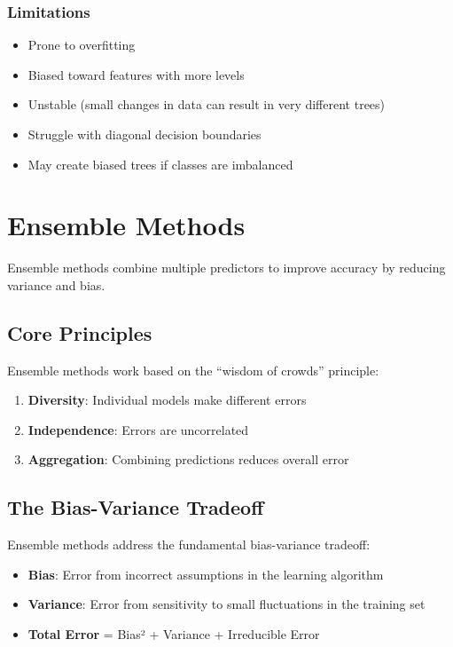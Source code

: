 \documentclass[
  letterpaper,
  DIV=11,
  numbers=noendperiod]{scrreprt}
\providecommand{\tightlist}{%
  \setlength{\itemsep}{0pt}\setlength{\parskip}{0pt}}\usepackage{longtable,booktabs,array}
\begin{document}
\subsubsection{Limitations}\label{limitations-1}

\begin{itemize}
\tightlist
\item
  Prone to overfitting
\item
  Biased toward features with more levels
\item
  Unstable (small changes in data can result in very different trees)
\item
  Struggle with diagonal decision boundaries
\item
  May create biased trees if classes are imbalanced
\end{itemize}

\section{Ensemble Methods}\label{ensemble-methods}

Ensemble methods combine multiple predictors to improve accuracy by
reducing variance and bias.

\subsection{Core Principles}\label{core-principles}

Ensemble methods work based on the ``wisdom of crowds'' principle:

\begin{enumerate}
\def\labelenumi{\arabic{enumi}.}
\tightlist
\item
  \textbf{Diversity}: Individual models make different errors
\item
  \textbf{Independence}: Errors are uncorrelated
\item
  \textbf{Aggregation}: Combining predictions reduces overall error
\end{enumerate}

\subsection{The Bias-Variance
Tradeoff}\label{the-bias-variance-tradeoff}

Ensemble methods address the fundamental bias-variance tradeoff:

\begin{itemize}
\tightlist
\item
  \textbf{Bias}: Error from incorrect assumptions in the learning
  algorithm
\item
  \textbf{Variance}: Error from sensitivity to small fluctuations in the
  training set
\item
  \textbf{Total Error} = Bias² + Variance + Irreducible Error
\end{itemize}
\end{document}
